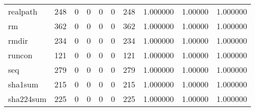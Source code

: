 \begin{longtable}{lrrrrrrrrr}
realpath  &                    248 &                                  0 &                                 0 &                                0 &                                 0 &                             248 &                                1.000000 &                                1.00000 &                             1.000000 \\
rm        &                    362 &                                  0 &                                 0 &                                0 &                                 0 &                             362 &                                1.000000 &                                1.00000 &                             1.000000 \\
rmdir     &                    234 &                                  0 &                                 0 &                                0 &                                 0 &                             234 &                                1.000000 &                                1.00000 &                             1.000000 \\
runcon    &                    121 &                                  0 &                                 0 &                                0 &                                 0 &                             121 &                                1.000000 &                                1.00000 &                             1.000000 \\
seq       &                    279 &                                  0 &                                 0 &                                0 &                                 0 &                             279 &                                1.000000 &                                1.00000 &                             1.000000 \\
sha1sum   &                    215 &                                  0 &                                 0 &                                0 &                                 0 &                             215 &                                1.000000 &                                1.00000 &                             1.000000 \\
sha224sum &                    225 &                                  0 &                                 0 &                                0 &                                 0 &                             225 &                                1.000000 &                                1.00000 &                             1.000000 \\

\end{longtable}
